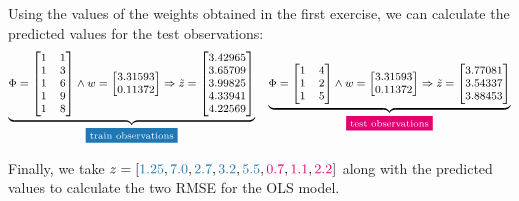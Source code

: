 \documentclass[12pt]{article}
\begin{document}
\begin{enumerate}
    \vspace{10pt}
    Using the values of the weights obtained in the first exercise, we can calculate the predicted values for the test observations:
    \begin{equation*}
        \footnotesize
        \underbrace{
        \Phi = \begin{bmatrix}
            1 & 1 \\
            1 & 3 \\
            1 & 6 \\
            1 & 9 \\
            1 & 8 
        \end{bmatrix} \land w = \begin{bmatrix}
            3.31593 \\
            0.11372
        \end{bmatrix} \Rightarrow \tilde{z} = \begin{bmatrix}
            3.42965 \\
            3.65709 \\
            3.99825 \\
            4.33941 \\
            4.22569
        \end{bmatrix} }_{\text{\colorbox{codeblue}{\textcolor{white}{train observations}}}}
        \quad \underbrace{
            \Phi = \begin{bmatrix}
            1 & 4 \\
            1 & 2 \\
            1 & 5 
        \end{bmatrix} \land w = \begin{bmatrix}
            3.31593 \\
            0.11372
        \end{bmatrix} \Rightarrow \tilde{z} = \begin{bmatrix}
            3.77081 \\
            3.54337 \\
            3.88453
        \end{bmatrix}
        }_{\text{\colorbox{codepink}{\textcolor{white}{test observations}}}}
    \end{equation*}

    Finally, we take $z = [\textcolor{codeblue}{1.25}, \textcolor{codeblue}{7.0}, \textcolor{codeblue}{2.7}, \textcolor{codeblue}{3.2}, \textcolor{codeblue}{5.5}, \textcolor{codepink}{0.7}, \textcolor{codepink}{1.1}, \textcolor{codepink}{2.2}]$ along with the predicted values to calculate the two RMSE for the OLS model.


\end{enumerate}
\end{document}
